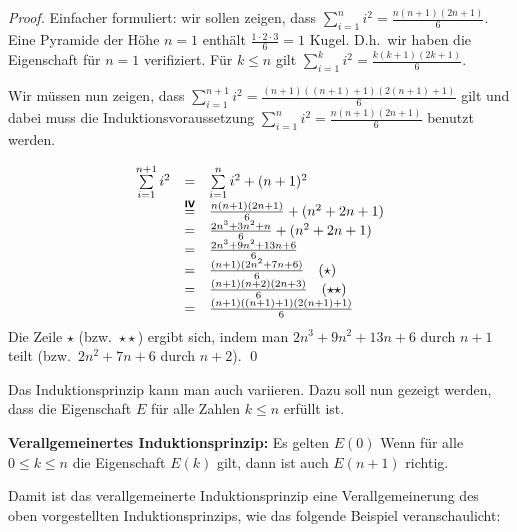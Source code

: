 \goodbreak
\begin{proof}
Einfacher formuliert: wir sollen zeigen, dass $\sum\limits_{i=1}^n i^2 =
\frac{n(n+1)(2n+1)}{6}$.
\induproof%
{Eine Pyramide der Höhe $n = 1$ enthält $\frac{1 \cdot 2 \cdot 3}{6} =
  1$ Kugel. D.h.~wir haben die Eigenschaft für $n = 1$ verifiziert.}%
{Für $k \le n$ gilt $\sum\limits_{i=1}^k i^2 = \frac{k(k+1)(2k+1)}{6}$.}%
{%
Wir müssen nun zeigen, dass $\sum\limits_{i=1}^{n+1} i^2 =
\frac{(n+1)((n+1)+1)(2(n+1)+1)}{6}$ gilt und dabei muss die
Induktionsvoraussetzung $\sum\limits_{i=1}^n i^2 = \frac{n(n+1)(2n+1)}{6}$
benutzt werden.  

\begin{displaymath}
\begin{array}{rcl}
\sum\limits_{i=1}^{n+1}i^2 &=& \sum\limits_{i=1}^{n}i^2 + (n + 1)^2\\
&\stackrel{\text{\textbf{\textsf{IV}}}}{=}& \frac{n(n+1)(2n+1)}{6} +
(n^2 + 2n + 1)\\
&=& \frac{2n^3 + 3n^2+n}{6} + (n^2 + 2n + 1)\\
&=& \frac{2n^3 + 9n^2+13n + 6}{6}\\
&=& \frac{(n+1)(2n^2+7n+6)}{6} \quad (\star)\\
&=& \frac{(n+1)(n+2)(2n+3)}{6} \quad (\star\star)\\
&=& \frac{(n+1)((n+1) + 1)(2(n + 1) + 1)}{6}\\
\end{array}
\end{displaymath}
Die Zeile $\star$ (bzw.~$\star\star$) ergibt sich, indem man $2n^3 +
9n^2+13n + 6$ durch $n+1$ teilt (bzw.~$2n^2+7n+6$ durch $n+2$). \qed
}
\end{proof}

Das Induktionsprinzip kann man auch variieren. Dazu soll nun gezeigt
werden, dass die Eigenschaft $E$ für alle Zahlen $k \le n$ erfüllt
ist.

\noindent\textbf{Verallgemeinertes Induktionsprinzip:} Es gelten 
\indudef%
{$E(0)$}%
{Wenn für alle $0 \le k \le n$ die Eigenschaft $E(k)$ gilt, dann ist 
auch $E(n+1)$ richtig.}
\medskip

Damit ist das verallgemeinerte Induktionsprinzip eine
Verallgemeinerung des oben vorgestellten Induktionsprinzips, wie das
folgende Beispiel veranschaulicht:

